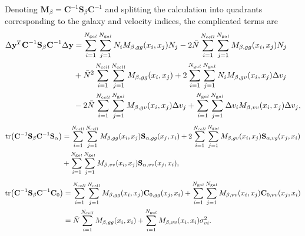 \documentclass{article}
\begin{document}
Denoting $\textbf{M}_\beta = \textbf{C}^{-1} \textbf{S}_\beta \textbf{C}^{-1}$ and splitting the calculation into quadrants  corresponding to the galaxy and velocity indices,
the complicated terms are
\begin{align*}
\Delta \textbf{y}^T \textbf{C}^{-1} \textbf{S}_\beta \textbf{C}^{-1} \Delta \textbf{y}  
&= \sum_{i=1}^{N_{\text gal}}  \sum_{j=1}^{N_{\text gal}} N_i M_{\beta,gg}(x_i,x_j) N_j 
 - 2\bar{N}   \sum_{i=1}^{N_{\text cell}} \sum_{j=1}^{N_{\text gal}}  M_{\beta,gg}(x_i,x_j) N_j \\
& +\bar{N}^2 \sum_{i=1}^{N_{\text cell}} \sum_{j=1}^{N_{\text cell}}  M_{\beta,gg}(x_i,x_j) 
 +   2 \sum_{i=1}^{N_{\text gal}}  \sum_{j=1}^{N_{\text gal}}  N_i M_{\beta,gv}(x_i,x_j) \Delta v_j  \\
& -   2 \bar{N}  \sum_{i=1}^{N_{\text cell}} \sum_{j=1}^{N_{\text gal}}  M_{\beta,gv}(x_i,x_j) \Delta v_j 
+ \sum_{i=1}^{N_{\text gal}}  \sum_{j=1}^{N_{\text gal}}  \Delta v_i M_{\beta,vv}(x_i,x_j) \Delta v_j ,
\end{align*}
\begin{align*}
\tr (\textbf{C}^{-1} \textbf{S}_\beta \textbf{C}^{-1} \textbf{S}_\alpha) & 
=  \sum_{i=1}^{N_{\text cell}} \sum_{j=1}^{N_{\text cell}} M_{\beta,gg}(x_i,x_j)\textbf{S}_{\alpha,gg}(x_j,x_i)  +  2 \sum_{i=1}^{N_{\text cell}} \sum_{j=1}^{N_{\text gal}} M_{\beta,gv}(x_i,x_j)\textbf{S}_{\alpha,vg} (x_j,x_i)\\
& + \sum_{i=1}^{N_{\text gal}} \sum_{j=1}^{N_{\text gal}} M_{\beta,vv}(x_i,x_j) \textbf{S}_{\alpha,vv}(x_j,x_i),
\end{align*}
\begin{align*}
\tr (\textbf{C}^{-1} \textbf{S}_\beta \textbf{C}^{-1} \textbf{C}_0) & 
=  \sum_{i=1}^{N_{\text cell}} \sum_{j=1}^{N_{\text cell}} M_{\beta,gg}(x_i,x_j)\textbf{C}_{0,gg}(x_j,x_i)  + \sum_{i=1}^{N_{\text gal}} \sum_{j=1}^{N_{\text gal}} M_{\beta,vv}(x_i,x_j) \textbf{C}_{0,vv}(x_j,x_i)\\
 & 
= \bar{N} \sum_{i=1}^{N_{\text cell}} M_{\beta,gg}(x_i,x_i)  + \sum_{i=1}^{N_{\text gal}}  M_{\beta,vv}(x_i,x_i) \sigma^{2}_{vi} .
\end{align*}
\end{document}
